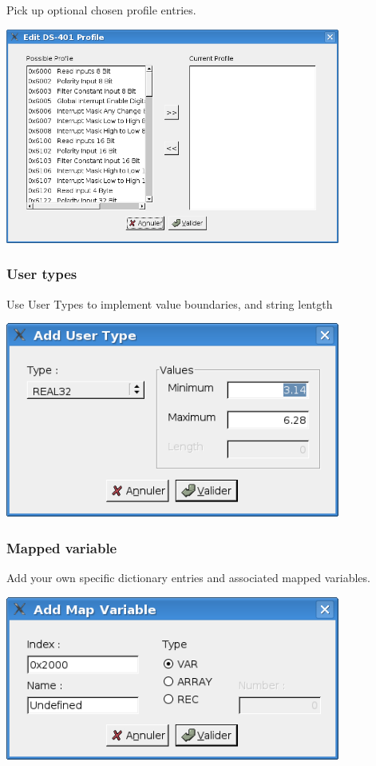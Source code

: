\documentclass[12pt,twoside]{article}
\begin{document}
Pick up optional chosen profile entries.\newline
 \begin{center}
   \includegraphics[width=11cm]{Pictures/10000201000002DE000001D82D89C224.png}
\end{center}

\subsubsection{User types}
Use User Types to implement value boundaries, and string lentgth\newline
 \begin{center}
   \includegraphics[width=11cm]{Pictures/10000201000001C40000010766961D7F.png}
\end{center}

\subsubsection{Mapped variable}
Add your own specific dictionary entries and associated mapped
variables.\newline
 \begin{center}
   \includegraphics[width=11cm]{Pictures/10000201000001C4000000DD129D4661.png}
\end{center}
\end{document}
